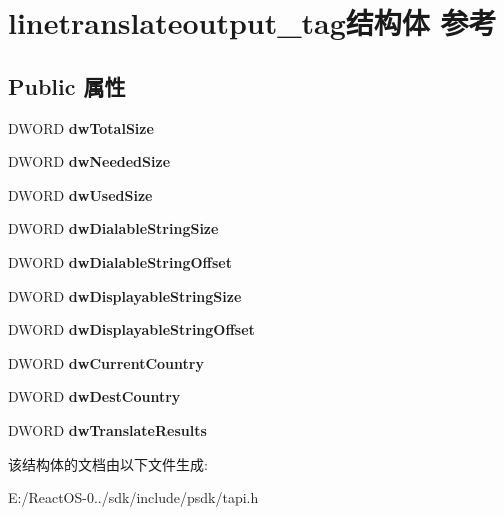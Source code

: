 \hypertarget{structlinetranslateoutput__tag}{}\section{linetranslateoutput\+\_\+tag结构体 参考}
\label{structlinetranslateoutput__tag}
\subsection*{Public 属性}
\begin{DoxyCompactItemize}
\item 
\mbox{\label{structlinetranslateoutput__tag_af6f03f653241f92c4ea4525f1faf0fc8}} 
D\+W\+O\+RD {\bfseries dw\+Total\+Size}
\item 
\mbox{\label{structlinetranslateoutput__tag_a619da821a2d162cf525794cfce132b37}} 
D\+W\+O\+RD {\bfseries dw\+Needed\+Size}
\item 
\mbox{\label{structlinetranslateoutput__tag_aafb965ae8db6df736cd2c66a81f458fe}} 
D\+W\+O\+RD {\bfseries dw\+Used\+Size}
\item 
\mbox{\label{structlinetranslateoutput__tag_a2842a826876134ce399bea4f926a8f6f}} 
D\+W\+O\+RD {\bfseries dw\+Dialable\+String\+Size}
\item 
\mbox{\label{structlinetranslateoutput__tag_ae5f3075b73af02288996aace875d6b9d}} 
D\+W\+O\+RD {\bfseries dw\+Dialable\+String\+Offset}
\item 
\mbox{\label{structlinetranslateoutput__tag_a16d1ee80e7377764c33ec97a90d2b935}} 
D\+W\+O\+RD {\bfseries dw\+Displayable\+String\+Size}
\item 
\mbox{\label{structlinetranslateoutput__tag_a45e45a32790f192e6ff9f48b5ae79a9e}} 
D\+W\+O\+RD {\bfseries dw\+Displayable\+String\+Offset}
\item 
\mbox{\label{structlinetranslateoutput__tag_ab1f203105e748fd10d29d8b511765195}} 
D\+W\+O\+RD {\bfseries dw\+Current\+Country}
\item 
\mbox{\label{structlinetranslateoutput__tag_aaa30d02d9b477bc6bb72c8e70afceaac}} 
D\+W\+O\+RD {\bfseries dw\+Dest\+Country}
\item 
\mbox{\label{structlinetranslateoutput__tag_a9a29d6a51ee5b21ef67f68bcfe329c0b}} 
D\+W\+O\+RD {\bfseries dw\+Translate\+Results}
\end{DoxyCompactItemize}


该结构体的文档由以下文件生成\+:\begin{DoxyCompactItemize}
\item 
E\+:/\+React\+O\+S-\/0../sdk/include/psdk/tapi.\+h\end{DoxyCompactItemize}
